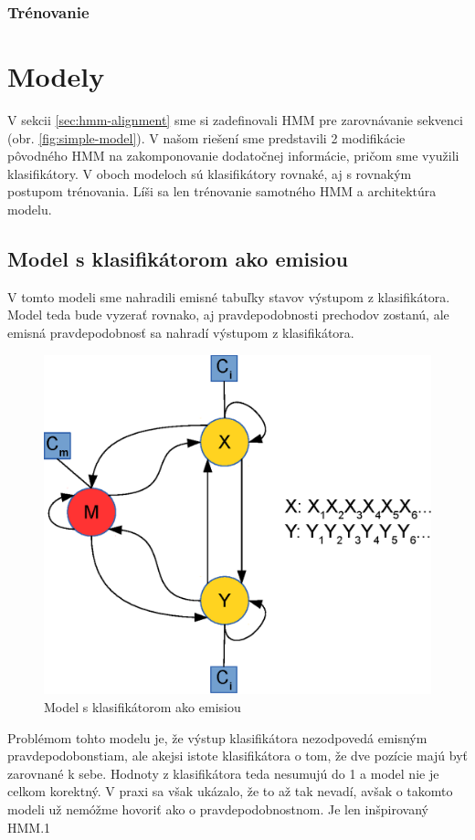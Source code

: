 \subsubsection{Trénovanie}
\todo

\section{Modely}

V sekcii \ref{sec:hmm-alignment} sme si zadefinovali HMM pre zarovnávanie sekvenci (obr. \ref{fig:simple-model}).
V našom riešení sme predstavili 2 modifikácie pôvodného HMM na zakomponovanie dodatočnej informácie, pričom sme využili klasifikátory. V oboch modeloch sú klasifikátory rovnaké, aj s rovnakým postupom trénovania. Líši sa len trénovanie samotného HMM a architektúra modelu.

\subsection{Model s klasifikátorom ako emisiou}

V tomto modeli sme nahradili emisné tabuľky stavov výstupom z klasifikátora.
Model teda bude vyzerať rovnako, aj pravdepodobnosti prechodov zostanú, ale emisná pravdepodobnosť sa nahradí výstupom z klasifikátora.

\begin{figure}[htp]
    \centering
    \includegraphics[width=.5\textwidth]{images/model_clf}
    \caption{Model s klasifikátorom ako emisiou}
\end{figure}


Problémom tohto modelu je, že výstup klasifikátora nezodpovedá emisným pravdepodobonstiam, ale akejsi istote klasifikátora o tom, že dve pozície majú byť zarovnané k sebe. Hodnoty z klasifikátora teda nesumujú do 1 a model nie je celkom korektný. V praxi sa však ukázalo, že to až tak nevadí, avšak o takomto modeli už nemóžme hovoriť ako o pravdepodobnostnom. Je len inšpirovaný HMM.1

